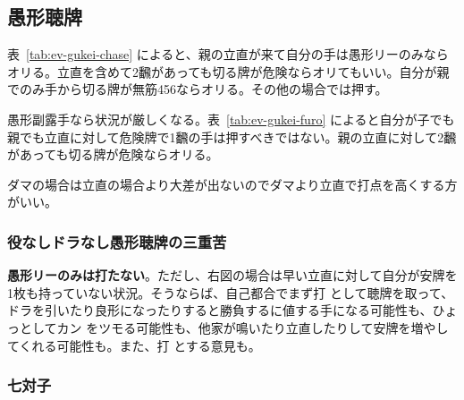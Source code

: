 \documentclass[../nankiru_main.tex]{subfiles}
\begin{document}
\subsection{愚形聴牌}

表~\ref{tab:ev-gukei-chase} によると、親の立直が来て自分の手は愚形リーのみならオリる。立直を含めて2飜があっても切る牌が危険ならオリてもいい。自分が親でのみ手から切る牌が無筋456ならオリる。その他の場合では押す。

愚形副露手なら状況が厳しくなる。表~\ref{tab:ev-gukei-furo} によると自分が子でも親でも立直に対して危険牌で1飜の手は押すべきではない。親の立直に対して2飜があっても切る牌が危険ならオリる。

ダマの場合は立直の場合より大差が出ないのでダマより立直で打点を高くする方がいい\citep[][p. 103]{miinin-stat}。


\subsubsection*{役なしドラなし愚形聴牌の三重苦}

\begin{minipage}[t][6.5cm]{\textwidth}
  \begin{figure}\vspace{-1.5\topskip}
  \end{figure}
  
  \textbf{愚形リーのみは打たない}。ただし、右図の場合は早い立直に対して自分が安牌を1枚も持っていない状況。そうならば、自己都合でまず打  として聴牌を取って、ドラを引いたり良形になったりすると勝負するに値する手になる可能性も、ひょっとしてカン  をツモる可能性も、他家が鳴いたり立直したりして安牌を増やしてくれる可能性も。また、打  とする意見も\citep[][pp.~154--155, p.~219]{fkt}。
\end{minipage}


\subsubsection*{七対子}
\end{document}
